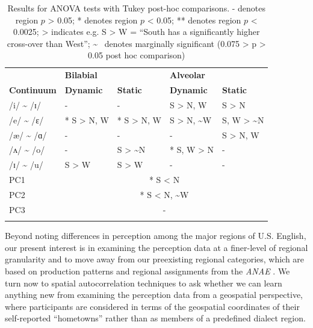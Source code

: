 \documentclass[output=paper]{LSP/langsci}
\begin{document}
\begin{table}
\begin{tabular}{lllll}
\lsptoprule 
& {\bfseries Bilabial} &  & {\bfseries Alveolar} & \\
\cmidrule(lr){2-3}\cmidrule(lr){4-5}
{\bfseries Continuum} & {\bfseries Dynamic} & {\bfseries Static} & {\bfseries Dynamic} & {\bfseries Static}\\
\midrule
{\mdseries /i/ {\textasciitilde} /ɪ/} & {\mdseries {}-} & {\mdseries {}-} & {\mdseries * S {\textgreater} N, W} & {\mdseries * S {\textgreater} N}\\
{\mdseries /e/ {\textasciitilde} /ɛ/ } & {\mdseries ** S {\textgreater} N, W} & {\mdseries ** S {\textgreater} N, W} & {\mdseries * S {\textgreater} N, {\textasciitilde}W} & {\mdseries * S, W {\textgreater} {\textasciitilde}N}\\
{\mdseries /æ/ {\textasciitilde} /ɑ/ } & {\mdseries {}-} & {\mdseries {}-} & {\mdseries {}-} & {\mdseries * S {\textgreater} N, W}\\
{\mdseries  /ʌ/ {\textasciitilde} /o/} & {\mdseries {}-} & {\mdseries * S {\textgreater} {\textasciitilde}N} & {\mdseries ** S, W {\textgreater} N} & {\mdseries {}-}\\
{\mdseries /ɪ/ {\textasciitilde} /u/} & {\mdseries * S {\textgreater} W} & {\mdseries * S {\textgreater} W} & {\mdseries {}-} & {\mdseries {}-}\\
\midrule
{\mdseries PC1} & \multicolumn{4}{c}{ * S {\textless} N\par}\\
{\mdseries PC2} & \multicolumn{4}{c}{ * S {\textless} N, {\textasciitilde}W\par}\\
{\mdseries PC3} & \multicolumn{4}{c}{ {}-\par}\\
\lspbottomrule
\end{tabular}
\label{tab:1}
\caption{Results for ANOVA tests with Tukey post-hoc comparisons. - denotes region $p$ {\textgreater} 0.05; * denotes region $p$ {\textless} 0.05; ** denotes region $p$ {\textless} 0.0025; {\textgreater} indicates e.g. S {\textgreater} W = “South has a significantly higher cross-over than West”; {\textasciitilde} ~denotes marginally significant (0.075 {\textgreater} p {\textgreater} 0.05 post hoc comparison)}
\end{table}

Beyond noting differences in perception among the major regions of U.S. English, our present interest is in examining the perception data at a finer-level of regional granularity and to move away from our preexisting regional categories, which are based on production patterns and regional assignments from the \textit{ANAE} \citep{labov_atlas_2006-1}. We turn now to spatial autocorrelation techniques to ask whether we can learn anything new from examining the perception data from a geospatial perspective, where participants are considered in terms of the geospatial coordinates of their self-reported “hometowns” rather than as members of a predefined dialect region. 
\end{document}
